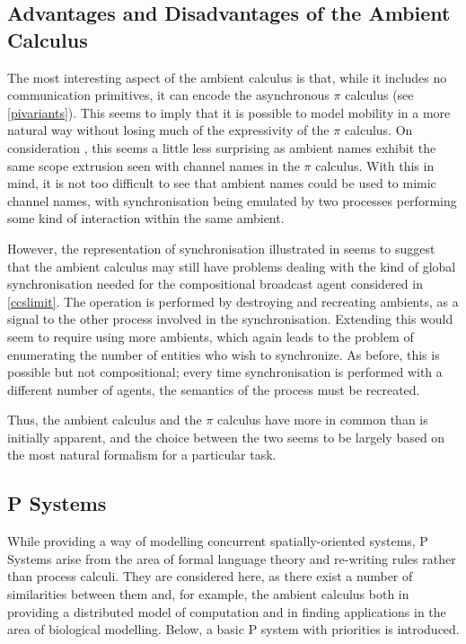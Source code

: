 \subsection{Advantages and Disadvantages of the Ambient Calculus}

The most interesting aspect of the ambient calculus is that, while it
includes no communication primitives, it can encode the asynchronous
$\pi$ calculus (see \ref{pivariants}).  This seems to imply that it is
possible to model mobility in a more natural way without losing much of
the expressivity of the $\pi$ calculus.  On consideration , this seems a
little less surprising as ambient names exhibit the same scope extrusion
seen with channel names in the $\pi$ calculus.  With this in mind, it is
not too difficult to see that ambient names could be used to mimic
channel names, with synchronisation being emulated by two processes
performing some kind of interaction within the same ambient.

However, the representation of synchronisation illustrated in \cite{amb}
seems to suggest that the ambient calculus may still have problems
dealing with the kind of global synchronisation needed for the
compositional broadcast agent considered in \ref{ccslimit}.  The
operation is performed by destroying and recreating ambients, as a
signal to the other process involved in the synchronisation.  Extending
this would seem to require using more ambients, which again leads to the
problem of enumerating the number of entities who wish to synchronize.
As before, this is possible but not compositional; every time
synchronisation is performed with a different number of agents, the
semantics of the process must be recreated.

Thus, the ambient calculus and the $\pi$ calculus have more in common
than is initially apparent, and the choice between the two seems to be
largely based on the most natural formalism for a particular task.



\subsection{P Systems}
\label{psystems}

While providing a way of modelling concurrent spatially-oriented
systems, P Systems \cite{membranecomp,membranehandbook} arise from
the area of formal language theory and re-writing rules rather than
process calculi.  They are considered here, as there exist a number of
similarities between them and, for example, the ambient calculus both
in providing a distributed model of computation and in finding
applications in the area of biological modelling.  Below, a basic P
system with priorities is introduced.

